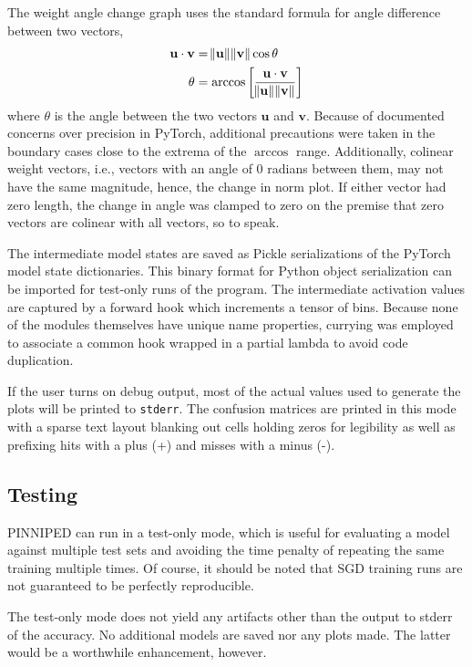 \documentclass[10pt,epsf]{article}
\newcommand{\mxn}[1]{\mathbf{#1}}
\begin{document}
{{    The weight angle change graph uses the standard formula for angle difference between two vectors\autocite[335]{Lay},
    \begin{align*}
      \mxn{u} \cdot \mxn{v} &= \norm{\mxn{u}} \norm{\mxn{v}} \cos \theta \\
      \theta &= \arccos \bigg[ \frac{\mxn{u} \cdot \mxn{v}}{ \norm{\mxn{u}} \norm{\mxn{v}} } \bigg]
    \end{align*}
    where $\theta$ is the angle between the two vectors $\mxn{u}$ and $\mxn{v}$. Because of documented
    concerns over precision in PyTorch\autocite{torchbug8069}, additional precautions were taken in
    the boundary cases close to the extrema of the $\arccos$ range. Additionally, colinear weight vectors,
    i.e., vectors with an angle of 0 radians between them, may not have the same magnitude, hence, the
    change in norm plot. If either vector had zero length, the change in angle was clamped to zero on
    the premise that zero vectors are colinear with all vectors, so to speak.

    The intermediate model states are saved as Pickle serializations of the PyTorch model state dictionaries.
    This binary format for Python object serialization can be imported for test-only runs of the program.
    The intermediate activation values are captured by a forward hook\autocite{torchactivations}
    which increments a tensor\autocite{torchtensors} of bins. Because none of the modules themselves
    have unique name properties, currying\autocite{functools} was employed to associate a common hook
    wrapped in a partial lambda to avoid code duplication.

    If the user turns on debug output, most of the actual values used to generate the plots will be printed
    to \texttt{stderr}. The confusion matrices are printed in this mode with a sparse text layout blanking
    out cells holding zeros for legibility as well as prefixing hits with a plus (+) and misses with a minus (-).
  }
  \subsection{Testing}{
    PINNIPED can run in a test-only mode, which is useful for evaluating a model against multiple test sets
    and avoiding the time penalty of repeating the same training multiple times. Of course, it should be noted
    that SGD training runs are not guaranteed to be perfectly reproducible.

    The test-only mode does not yield any artifacts other than the output to stderr of the accuracy. No
    additional models are saved nor any plots made. The latter would be a worthwhile enhancement, however.
  }
}
\end{document}
